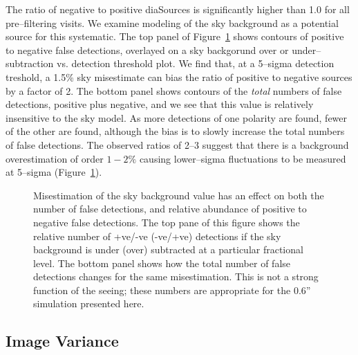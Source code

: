 \documentclass[floatfix, apj]{emulateapj}
\begin{document}
The ratio of negative to positive diaSources is significantly higher than 1.0 for all pre--filtering visits.
We examine modeling of the sky background as a potential source for this systematic.
The top panel of Figure~\ref{fig:2} shows contours of positive to negative false detections, overlayed on a sky backgorund over or under--subtraction vs. detection threshold plot.
We find that, at a 5--sigma detection treshold, a 1.5\% sky misestimate can bias the ratio of positive to negative sources by a factor of 2.
The bottom panel shows contours of the {\it total} numbers of false detections, positive plus negative, and we see that this value is relatively insensitive to the sky model.
As more detections of one polarity are found, fewer of the other are found, although the bias is to slowly increase the total numbers of false detections.
The observed ratios of 2--3 suggest that there is a background overestimation of order $1-2\%$ causing lower--sigma fluctuations to be measured at 5--sigma (Figure~\ref{fig:2}).
\begin{figure}[!ht]
\centering
{}
\caption{
Misestimation of the sky background value has an effect on both the number of false detections, and relative abundance of positive to negative false detections.
The top pane of this figure shows the relative number of +ve/-ve (-ve/+ve) detections if the sky background is under (over) subtracted at a particular fractional level.
The  bottom panel shows how the total number of false detections changes for the same misestimation.
This is not a strong function of the seeing; these numbers are appropriate for the 0.6'' simulation presented here.
}
\label{fig:2}
\end{figure}

\subsection{Image Variance \label{sec-varmis}}
\end{document}
